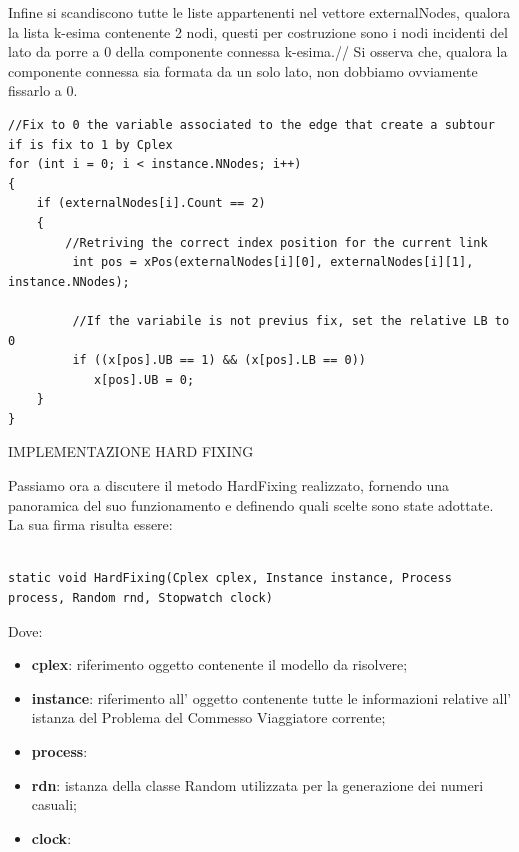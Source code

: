 \documentclass[11pt]{article}
\begin{document}
Infine si scandiscono tutte le liste appartenenti nel vettore externalNodes, qualora la lista k-esima contenente 2 nodi, questi per costruzione sono i nodi incidenti del lato da porre a 0 della componente connessa k-esima.//
Si osserva che, qualora la componente connessa sia formata da un solo lato, non dobbiamo ovviamente fissarlo a 0. 

\begin{lstlisting}  
//Fix to 0 the variable associated to the edge that create a subtour if is fix to 1 by Cplex
for (int i = 0; i < instance.NNodes; i++)
{
	if (externalNodes[i].Count == 2)
	{
		//Retriving the correct index position for the current link 
         int pos = xPos(externalNodes[i][0], externalNodes[i][1], instance.NNodes);

         //If the variabile is not previus fix, set the relative LB to 0
         if ((x[pos].UB == 1) && (x[pos].LB == 0))
            x[pos].UB = 0;
	}
}

\end{lstlisting}


\vspace{2\baselineskip}
IMPLEMENTAZIONE HARD FIXING
\vspace{2\baselineskip} 

Passiamo ora a discutere il metodo HardFixing realizzato, fornendo una panoramica del suo funzionamento e definendo quali scelte sono state adottate. La sua firma risulta essere:

\begin{lstlisting}

static void HardFixing(Cplex cplex, Instance instance, Process process, Random rnd, Stopwatch clock)

\end{lstlisting}

Dove:

\begin{itemize}
    \item \textbf{cplex}: riferimento oggetto contenente il modello da risolvere;
    \item \textbf{instance}: riferimento all' oggetto contenente tutte le informazioni relative all' istanza del Problema del Commesso Viaggiatore corrente;
    \item \textbf{process}: 
    \item \textbf{rdn}: istanza della classe Random utilizzata per la generazione dei numeri casuali;
    \item \textbf{clock}: 
\end{itemize}
\end{document}
